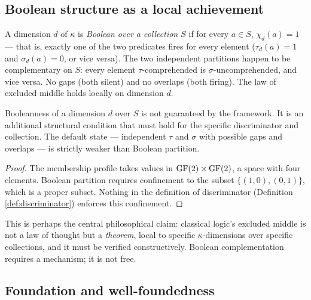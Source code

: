 \subsection{Boolean structure as a local achievement}

\begin{definition}\label{def:boolean-dim}
A dimension $d$ of $\kappa$ is \emph{Boolean over a collection $S$}
if for every $a \in S$, $\chi_d(a) = 1$ --- that is, exactly one of
the two predicates fires for every element ($\tau_d(a) = 1$
and $\sigma_d(a) = 0$, or vice versa). The two independent
partitions happen to be complementary on $S$: every element
$\tau$-comprehended is $\sigma$-uncomprehended, and vice versa.
No gaps (both silent) and no overlaps (both firing). The law of
excluded middle holds locally on dimension $d$.
\end{definition}

\begin{proposition}\label{prop:nondefault}
Booleanness of a dimension $d$ over $S$ is not guaranteed by the
framework. It is an additional structural condition that must hold
for the specific discriminator and collection. The default state
--- independent $\tau$ and $\sigma$ with possible gaps and
overlaps --- is strictly weaker than Boolean partition.
\end{proposition}

\begin{proof}
The membership profile takes values in $\operatorname{GF}(2) \times \operatorname{GF}(2)$,
a space with four elements. Boolean partition requires confinement
to the subset $\{(1,0), (0,1)\}$, which is a proper subset.
Nothing in the definition of discriminator (Definition
\ref{def:discriminator}) enforces this confinement.
\end{proof}

\begin{remark}
This is perhaps the central philosophical claim: classical logic's
excluded middle is not a law of thought but a \emph{theorem}, local
to specific $\kappa$-dimensions over specific collections, and it
must be verified constructively. Boolean complementation requires a
mechanism; it is not free.
\end{remark}

\subsection{Foundation and well-foundedness}


